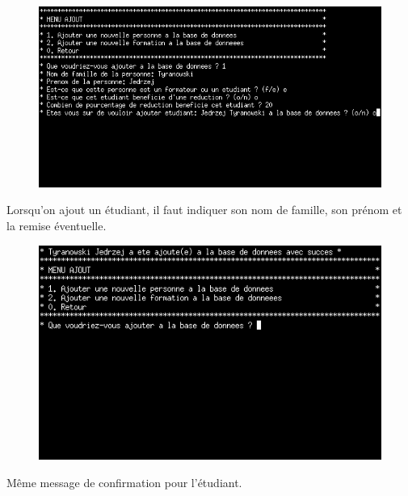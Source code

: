 \documentclass[11pt]{article}
\begin{document}
\begin{figure}[ht]
  \centering
  \includegraphics[trim=0 110 0 0, clip, width=\textwidth]{images/09.png}
\end{figure}
Lorsqu'on ajout un étudiant, il faut indiquer son nom de famille, son prénom et la remise éventuelle.

\begin{figure}[ht]
  \centering
  \includegraphics[trim=0 180 0 0, clip, width=\textwidth]{images/10.png}
\end{figure}
Même message de confirmation pour l'étudiant.


\newpage
\end{document}

